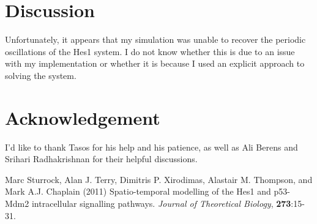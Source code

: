 \documentclass{bioinfo}
\begin{document}
\section*{Discussion}
Unfortunately, it appears that my simulation was unable to recover the periodic oscillations of the Hes1 system.
I do not know whether this is due to an issue with my implementation or whether it is because I used an explicit approach to solving the system.

\section*{Acknowledgement}
I'd like to thank Tasos for his help and his patience, as well as Ali Berens and Srihari Radhakrishnan for their helpful discussions.


%
%
%
%
%
%
%
%
%


\begin{thebibliography}{}
 Marc Sturrock, Alan J. Terry, Dimitris P. Xirodimas, Alastair M. Thompson, and Mark A.J. Chaplain (2011) Spatio-temporal modelling of the Hes1 and p53-Mdm2 intracellular signalling pathways. \textit{Journal of Theoretical Biology}, \textbf{273}:15-31.

\end{thebibliography}

\onecolumn
\end{document}
